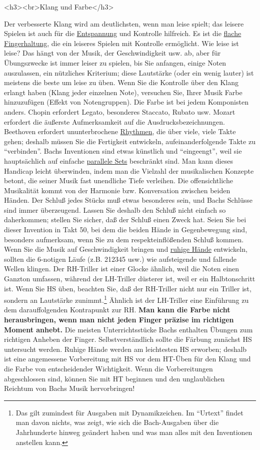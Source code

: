 <h3><br>Klang und Farbe</h3>

Der verbesserte Klang wird am deutlichsten, wenn man leise spielt; das leisere Spielen ist auch für die \hyperlink{c1ii14}{Entspannung} und Kontrolle hilfreich.
Es ist die \hyperlink{c1iii4b}{flache Fingerhaltung}, die ein leiseres Spielen mit Kontrolle ermöglicht.
Wie leise ist leise?
Das hängt von der Musik, der Geschwindigkeit usw. ab, aber für Übungszwecke ist immer leiser zu spielen, bis Sie anfangen, einige Noten auszulassen, ein nützliches Kriterium; diese Lautstärke (oder ein wenig lauter) ist meistens die beste um leise zu üben.
Wenn Sie die Kontrolle über den Klang erlangt haben (Klang jeder einzelnen Note), versuchen Sie, Ihrer Musik Farbe hinzuzufügen (Effekt von Notengruppen).
Die Farbe ist bei jedem Komponisten anders.
Chopin erfordert Legato, besonderes Staccato, Rubato usw.
Mozart erfordert die äußerste Aufmerksamkeit auf die Ausdrucksbezeichnungen.
Beethoven erfordert ununterbrochene \hyperlink{c1iii1b}{Rhythmen}, die über viele, viele Takte gehen; deshalb müssen Sie die Fertigkeit entwickeln, aufeinanderfolgende Takte zu \enquote{verbinden}.
Bachs Inventionen sind etwas künstlich und \enquote{eingeengt}, weil sie hauptsächlich auf einfache \hyperlink{c1iii7b}{parallele Sets} beschränkt sind.
Man kann dieses Handicap leicht überwinden, indem man die Vielzahl der musikalischen Konzepte betont, die seiner Musik fast unendliche Tiefe verleihen.
Die offensichtliche Musikalität kommt von der Harmonie bzw. Konversation zwischen beiden Händen.
Der Schluß jedes Stücks muß etwas besonderes sein, und Bachs Schlüsse sind immer überzeugend.
Lassen Sie deshalb den Schluß nicht einfach so daherkommen; stellen Sie sicher, daß der Schluß einen Zweck hat.
Seien Sie bei dieser Invention in Takt 50, bei dem die beiden Hände in Gegenbewegung sind, besonders aufmerksam, wenn Sie zu dem respekteinflößenden Schluß kommen.
Wenn Sie die Musik auf Geschwindigkeit bringen und \hyperlink{ruhig}{ruhige Hände} entwickeln, sollten die 6-notigen Läufe (z.B. 212345 usw.) wie aufsteigende und fallende Wellen klingen.
Der RH-Triller ist einer Glocke ähnlich, weil die Noten einen Ganzton umfassen, während der LH-Triller düsterer ist, weil er ein Halbtonschritt ist.
Wenn Sie HS üben, beachten Sie, daß der RH-Triller nicht nur ein Triller ist, sondern an Lautstärke zunimmt.\footnote{Das gilt zumindest für Ausgaben mit Dynamikzeichen. Im \enquote{Urtext} findet man davon nichts, was zeigt, wie sich die Bach-Ausgaben über die Jahrhunderte hinweg geändert haben und was man alles mit den Inventionen anstellen kann.}
Ähnlich ist der LH-Triller eine Einführung zu dem darauffolgenden Kontrapunkt zur RH.
\textbf{Man kann die Farbe nicht herausbringen, wenn man nicht jeden Finger präzise im richtigen Moment anhebt.}
Die meisten Unterrichtsstücke Bachs enthalten Übungen zum richtigen Anheben der Finger.
Selbstverständlich sollte die Färbung zunächst HS untersucht werden.
Ruhige Hände werden am leichtesten HS erworben; deshalb ist eine angemessene Vorbereitung mit HS vor dem HT-Üben für den Klang und die Farbe von entscheidender Wichtigkeit.
Wenn die Vorbereitungen abgeschlossen sind, können Sie mit HT beginnen und den unglaublichen Reichtum von Bachs Musik hervorbringen!

